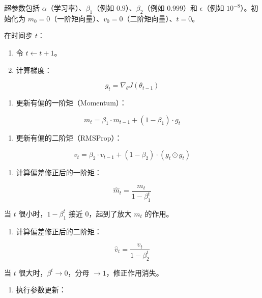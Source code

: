 超参数包括 \(\alpha\)（学习率）、\(\beta_1\)（例如 \(0.9\)）、\(\beta_2\)（例如 \(0.999\)）和 \(\epsilon\)（例如 \(10^{-8}\)）。初始化为 \(m_0=0\)（一阶矩向量）、\(v_0=0\)（二阶矩向量）、\(t=0\)。

在时间步 \(t\)：

\begin{enumerate}
\def\labelenumi{\arabic{enumi}.}
\tightlist
\item
  令 \(t \leftarrow t+1\)。
\item
  计算梯度：
\end{enumerate}

\[
g_t = \nabla_\theta J(\theta_{t-1})
\]

\begin{enumerate}
\def\labelenumi{\arabic{enumi}.}
\setcounter{enumi}{2}
\tightlist
\item
  更新有偏的一阶矩（Momentum）：
\end{enumerate}

\[
m_t = \beta_1 \cdot m_{t-1} + (1-\beta_1)\cdot g_t
\]

\begin{enumerate}
\def\labelenumi{\arabic{enumi}.}
\setcounter{enumi}{3}
\tightlist
\item
  更新有偏的二阶矩（RMSProp）：
\end{enumerate}

\[
v_t = \beta_2 \cdot v_{t-1} + (1-\beta_2)\cdot (g_t \odot g_t)
\]

\begin{enumerate}
\def\labelenumi{\arabic{enumi}.}
\setcounter{enumi}{4}
\tightlist
\item
  计算偏差修正后的一阶矩：
\end{enumerate}

\[
\hat{m}_t = \frac{m_t}{1-\beta_1^t}
\]

当 \(t\) 很小时，\(1-\beta_1^t\) 接近 \(0\)，起到了放大 \(m_t\) 的作用。

\begin{enumerate}
\def\labelenumi{\arabic{enumi}.}
\setcounter{enumi}{5}
\tightlist
\item
  计算偏差修正后的二阶矩：
\end{enumerate}

\[
\hat{v}_t = \frac{v_t}{1-\beta_2^t}
\]

当 \(t\) 很大时，\(\beta^t \to 0\)，分母 \(\to 1\)，修正作用消失。

\begin{enumerate}
\def\labelenumi{\arabic{enumi}.}
\setcounter{enumi}{6}
\tightlist
\item
  执行参数更新：
\end{enumerate}

